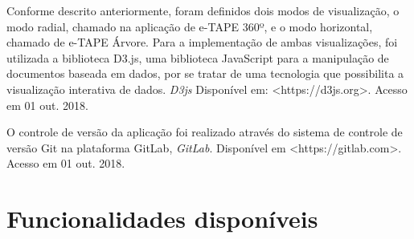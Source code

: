 \par
Conforme descrito anteriormente, foram definidos dois modos de visualização, o modo radial, chamado na aplicação de e-TAPE 360º, e o modo horizontal, 
chamado de e-TAPE Árvore. Para a implementação de ambas visualizações, foi utilizada a biblioteca D3.js, uma biblioteca JavaScript para a manipulação de documentos 
baseada em dados, por se tratar de uma tecnologia que possibilita a visualização interativa de dados.
\textit{D3js} Disponível em: <https://d3js.org>. Acesso em 01 out. 2018.

\par
O controle de versão da aplicação foi realizado através do sistema de controle de versão Git na plataforma GitLab, \textit{GitLab}. 
Disponível em <https://gitlab.com>. Acesso em 01 out. 2018.

\section{Funcionalidades disponíveis}
\label{sec:funcionamento}
